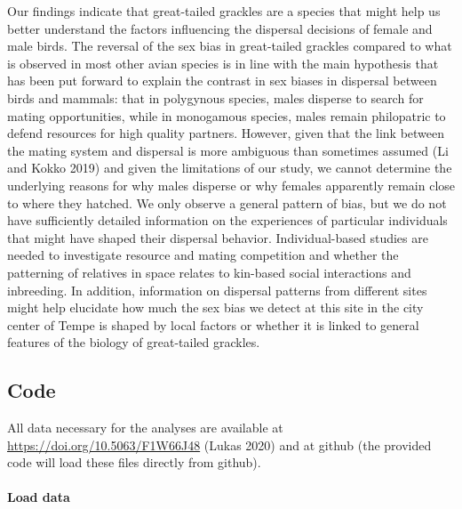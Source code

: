 \documentclass[
]{article}
\begin{document}
Our findings indicate that great-tailed grackles are a species that
might help us better understand the factors influencing the dispersal
decisions of female and male birds. The reversal of the sex bias in
great-tailed grackles compared to what is observed in most other avian
species is in line with the main hypothesis that has been put forward to
explain the contrast in sex biases in dispersal between birds and
mammals: that in polygynous species, males disperse to search for mating
opportunities, while in monogamous species, males remain philopatric to
defend resources for high quality partners. However, given that the link
between the mating system and dispersal is more ambiguous than sometimes
assumed (Li and Kokko 2019) and given the limitations of our study, we
cannot determine the underlying reasons for why males disperse or why
females apparently remain close to where they hatched. We only observe a
general pattern of bias, but we do not have sufficiently detailed
information on the experiences of particular individuals that might have
shaped their dispersal behavior. Individual-based studies are needed to
investigate resource and mating competition and whether the patterning
of relatives in space relates to kin-based social interactions and
inbreeding. In addition, information on dispersal patterns from
different sites might help elucidate how much the sex bias we detect at
this site in the city center of Tempe is shaped by local factors or
whether it is linked to general features of the biology of great-tailed
grackles.

\newpage

\hypertarget{code}{%
\subsection{Code}\label{code}}

All data necessary for the analyses are available at
\url{https://doi.org/10.5063/F1W66J48} (Lukas 2020) and at github (the
provided code will load these files directly from github).

\hypertarget{load-data}{%
\paragraph{Load data}\label{load-data}}
\end{document}
